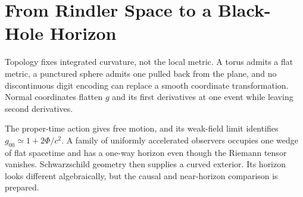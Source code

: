 \section{From Rindler Space to a Black-Hole Horizon}

Topology fixes integrated curvature, not the local metric.  A torus
admits a flat metric, a punctured sphere admits one pulled back from the
plane, and no discontinuous digit encoding can replace a smooth
coordinate transformation.  Normal coordinates flatten \(g\) and its
first derivatives at one event while leaving second derivatives.

The proper-time action gives free motion, and its weak-field limit
identifies \(g_{00}\simeq1+2\Phi/c^2\).  A family of uniformly
accelerated observers occupies one wedge of flat spacetime and has a
one-way horizon even though the Riemann tensor vanishes.  Schwarzschild
geometry then supplies a curved exterior.  Its horizon looks different
algebraically, but the causal and near-horizon comparison is prepared.
